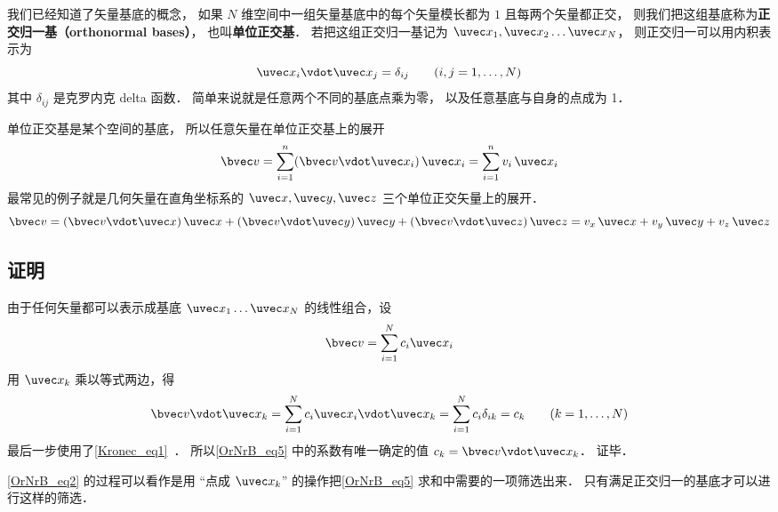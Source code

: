 

我们已经知道了矢量基底的概念， 如果 $N$ 维空间中一组矢量基底中的每个矢量模长都为 $1$ 且每两个矢量都正交， 则我们把这组基底称为\textbf{正交归一基（orthonormal bases）}， 也叫\textbf{单位正交基}． 若把这组正交归一基记为 $\uvec x_1,\uvec x_2\dots\uvec x_N$， 则正交归一可以用内积表示为
\begin{equation}\label{OrNrB_eq3}
\uvec x_i \vdot \uvec x_j = \delta_{ij} \qquad (i,j = 1,\dots, N)
\end{equation}
其中 $\delta_{ij}$ 是克罗内克 delta 函数． 简单来说就是任意两个不同的基底点乘为零， 以及任意基底与自身的点成为 1．

单位正交基是某个空间的基底， 所以任意矢量在单位正交基上的展开
\begin{equation}\label{OrNrB_eq1}
\bvec v = \sum_{i = 1}^n (\bvec v\vdot\uvec x_i)\,\uvec x_i = \sum_{i = 1}^n v_i \,\uvec x_i
\end{equation}
最常见的例子就是几何矢量在直角坐标系的 $\uvec x, \uvec y, \uvec z$ 三个单位正交矢量上的展开．
 \begin{equation}
\bvec v = (\bvec v \vdot \uvec x)\,\uvec x + (\bvec v \vdot \uvec y)\,\uvec y + (\bvec v \vdot \uvec z)\,\uvec z = v_x \,\uvec x + v_y \,\uvec y + v_z \,\uvec z
\end{equation} 

\subsection{证明}
由于任何矢量都可以表示成基底 $\uvec x_1 \dots \uvec x_N$ 的线性组合，设
\begin{equation}\label{OrNrB_eq5}
\bvec v = \sum_{i = 1}^N c_i \uvec x_i
\end{equation} 
用 $\uvec x_k$ 乘以等式两边，得
\begin{equation}\label{OrNrB_eq2}
\bvec v \vdot \uvec x_k = \sum_{i = 1}^N  c_i \uvec x_i \vdot\uvec x_k = \sum_{i = 1}^N c_i \delta_{ik}  = c_k \qquad (k = 1, \dots, N)
\end{equation}
最后一步使用了\autoref{Kronec_eq1}~． 所以\autoref{OrNrB_eq5} 中的系数有唯一确定的值 $c_k = \bvec v \vdot\uvec x_k$． 证毕．

\autoref{OrNrB_eq2} 的过程可以看作是用 “点成 $\uvec x_k$” 的操作把\autoref{OrNrB_eq5} 求和中需要的一项筛选出来． 只有满足正交归一的基底才可以进行这样的筛选．
